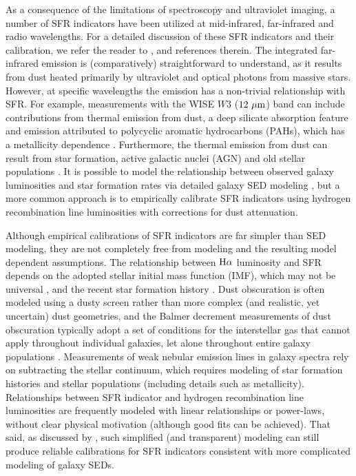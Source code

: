 \documentclass[preprint]{aastex61}
\begin{document}
As a consequence of the limitations of spectroscopy and ultraviolet imaging, a number of SFR indicators have been utilized at mid-infrared, far-infrared and radio wavelengths. For a detailed discussion of these SFR indicators and their calibration, we refer the reader to \citet{ken09}, \citet{ken12} and references therein. The integrated far-infrared emission is (comparatively) straightforward to understand, as it results from dust heated primarily by ultraviolet and optical photons from massive stars. However, at specific wavelengths the emission has a non-trivial relationship with SFR. For example, measurements with the WISE $W3$ ($12~{\rm \mu m}$) band can include contributions from thermal emission from dust, a deep silicate absorption feature and emission attributed to polycyclic aromatic hydrocarbons (PAHs), which has a metallicity dependence \citep[e.g.,][]{hou04b,eng05,jac06,dra07,smi07,eng08}. Furthermore, the thermal emission from dust can result from star formation, active galactic nuclei (AGN) and old stellar populations \citep[e.g.,][]{wal87,ben10,boq11}. It is possible to model the relationship between observed galaxy luminosities and star formation rates via detailed galaxy SED modeling \citep[e.g.,][]{dac08,boq16,dav16,lej16}, but a more common approach is to empirically calibrate SFR indicators using hydrogen recombination line luminosities with corrections for dust attenuation.

Although empirical calibrations of SFR indicators are far simpler than SED modeling, they are not completely free from modeling and the resulting model dependent assumptions. The relationship between ${\rm H\alpha}$ luminosity and SFR depends on the adopted stellar initial mass function (IMF), which may not be universal \citep[e.g.,][]{van10}, and the recent star formation history \citep[e.g.][]{wei12,das14}. Dust obscuration is often modeled using a dusty screen rather than more complex (and realistic, yet uncertain) dust geometries, and the Balmer decrement measurements of dust obscuration typically adopt a set of conditions for the interstellar gas that cannot apply throughout individual galaxies, let alone throughout entire galaxy populations \citep[e.g.,][ and references therein]{cal94,boq12}. Measurements of weak nebular emission lines in galaxy spectra rely on subtracting the stellar continuum, which requires modeling of star formation histories and stellar populations (including details such as metallicity). Relationships between SFR indicator and hydrogen recombination line luminosities are frequently modeled with linear relationships or power-laws, without clear physical motivation (although good fits can be achieved). That said, as discussed by \citet{ken09}, such simplified (and transparent) modeling can still produce reliable calibrations for SFR indicators consistent with more complicated modeling of galaxy SEDs. 
\end{document}
